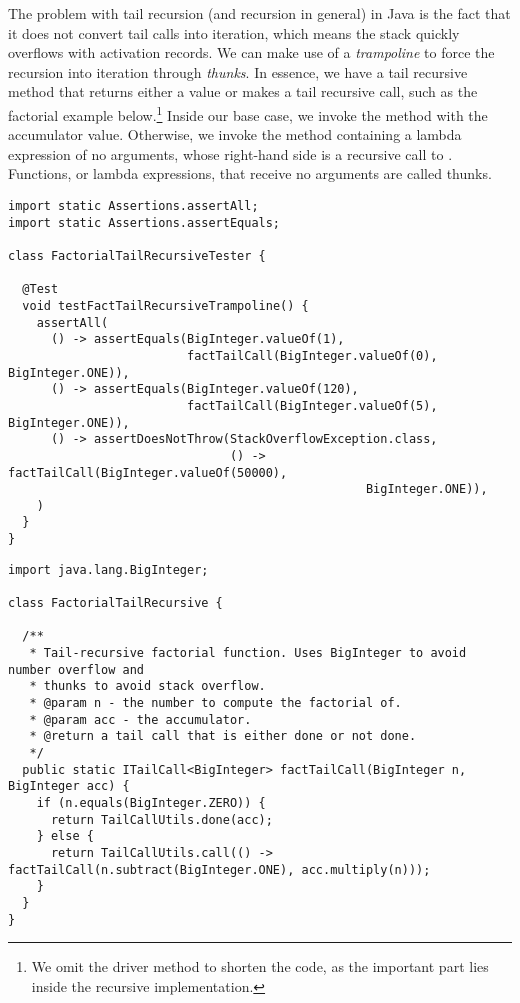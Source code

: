 The problem with tail recursion (and recursion in general) in Java is the fact that it does not convert tail calls into iteration, which means the stack quickly overflows with activation records. We can make use of a \textit{trampoline} to force the recursion into iteration through \textit{thunks}. In essence, we have a tail recursive method that returns either a value or makes a tail recursive call, such as the factorial example below.\footnote{We omit the driver method to shorten the code, as the important part lies inside the recursive implementation.} Inside our base case, we invoke the  method with the accumulator value. Otherwise, we invoke the  method containing a lambda expression of no arguments, whose right-hand side is a recursive call to . Functions, or lambda expressions, that receive no arguments are called thunks.

\begin{cl}{}
\begin{lstlisting}[language=MyJava]
import static Assertions.assertAll;
import static Assertions.assertEquals;

class FactorialTailRecursiveTester {
  
  @Test 
  void testFactTailRecursiveTrampoline() {
    assertAll(
      () -> assertEquals(BigInteger.valueOf(1), 
                         factTailCall(BigInteger.valueOf(0), BigInteger.ONE)),
      () -> assertEquals(BigInteger.valueOf(120), 
                         factTailCall(BigInteger.valueOf(5), BigInteger.ONE)),
      () -> assertDoesNotThrow(StackOverflowException.class,
                               () -> factTailCall(BigInteger.valueOf(50000), 
                                                  BigInteger.ONE)),
    )
  }
}
\end{lstlisting}
\end{cl}

\begin{cl}{}
\begin{lstlisting}[language=MyJava]
import java.lang.BigInteger;

class FactorialTailRecursive {
 
  /**
   * Tail-recursive factorial function. Uses BigInteger to avoid number overflow and
   * thunks to avoid stack overflow.
   * @param n - the number to compute the factorial of.
   * @param acc - the accumulator.
   * @return a tail call that is either done or not done.
   */
  public static ITailCall<BigInteger> factTailCall(BigInteger n, BigInteger acc) {
    if (n.equals(BigInteger.ZERO)) {
      return TailCallUtils.done(acc);
    } else {
      return TailCallUtils.call(() -> factTailCall(n.subtract(BigInteger.ONE), acc.multiply(n)));
    }
  }
}
\end{lstlisting}
\end{cl}

